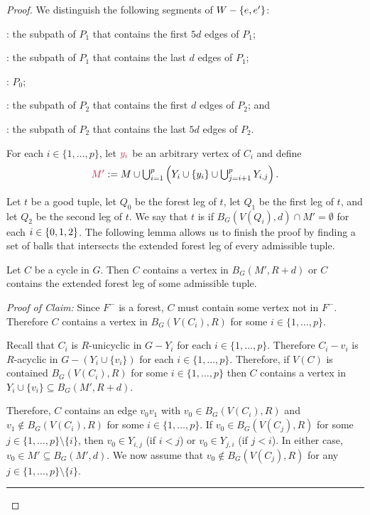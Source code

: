 \documentclass{patmorin}
\newcommand{\pat}[1]{\textcolor{Blue}{Pat: #1}}
\newenvironment{clmproof}{\noindent\emph{Proof of Claim:}}{\hfill\rule{1ex}{1ex}\newline}
\DeclarePairedDelimiter\set{\{}{\}}
\begin{document}
\begin{proof}
We distinguish the following segments of $W-\set{e,e'}$:
\begin{compactenum}[(a)]
\item {}: the subpath of $P_1$ that contains the first $5d$ edges of $P_1$;
\item {}: the subpath of $P_1$ that contains the last $d$ edges of $P_1$;
\item {}: $P_0$;
\item {}: the subpath of $P_2$ that contains the first $d$ edges of $P_2$; and
\item {}: the subpath of $P_2$ that contains the last $5d$ edges of $P_2$.
\end{compactenum}


For each $i\in\{1,\ldots,p\}$, let $\mathdefin{y_i}$ be an arbitrary vertex of $C_i$ and define
\[
\textstyle \mathdefin{M'}:= M \cup \bigcup_{i=1}^p \left(Y_i\cup\{y_i\} \cup \bigcup_{j=i+1}^{p} Y_{i,j}\right).
\]

Let $t$ be a good tuple, let $Q_0$ be the forest leg of $t$, let $Q_1$ be the first leg of $t$, and let $Q_2$ be the second leg of $t$. 
We say that $t$ is  if
$B_G(V(Q_i),d) \cap M' = \emptyset$ for each $i\in\set{0,1,2}$.   The following lemma allows us to finish the proof by finding a set of balls that intersects the extended forest leg of every admissible tuple.

\begin{clm}
  Let $C$ be a cycle in $G$.  Then  $C$ contains a vertex in $B_G(M',R+d)$ or $C$ contains the extended forest leg of some admissible tuple.
\end{clm}

\begin{clmproof}
  Since $F^-$ is a forest, $C$ must contain some vertex not in $F^-$.  Therefore $C$ contains a vertex in $B_G(V(C_i),R)$ for some $i\in\{1,\ldots,p\}$.
  
  Recall that $C_i$ is $R$-unicyclic in $G-Y_i$ for each $i\in\{1,\ldots,p\}$.  Therefore  $C_i-v_i$ is $R$-acyclic in $G-(Y_i\cup\{v_i\})$ for each $i\in\{1,\ldots,p\}$.  Therefore, if $V(C)$ is contained $B_G(V(C_i),R)$ for some $i\in\{1,\ldots,p\}$ then $C$ contains a vertex in $Y_i\cup\{v_i\}\subseteq B_G(M',R+d)$.  

  Therefore, $C$ contains an edge $v_0v_1$ with $v_0\in B_G(V(C_i),R)$ and $v_1\notin B_G(V(C_i),R)$ for some $i\in\{1,\ldots,p\}$.  If $v_0\in B_G(V(C_j),R)$ for some $j\in\{1,\ldots,p\}\setminus\{i\}$, then $v_0\in Y_{i,j}$ (if $i< j$) or $v_0\in Y_{j,i}$ (if $j<i$).  In either case, $v_0\in M'\subseteq B_G(M',d)$.  We now assume that $v_0\notin B_G(V(C_j),R)$ for any $j\in\{1,\ldots,p\}\setminus\{i\}$.


\end{clmproof}
\end{proof}
\end{document}
